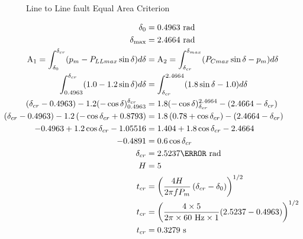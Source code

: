 \documentclass[main.tex]{subfiles}
\begin{document}
\begin{enumerate}
\begin{figure}
\centering{}
\caption{Line to Line fault Equal Area Criterion}
\label{fig:24a_b}
\end{figure}

$$
\begin{aligned}
\delta_0&=0.4963 \text{~rad} \\
\delta_{\mathrm{max}} &= 2.4664 \text{~rad}\\
\mathrm{A}_1=\int_{\delta_0}^{\delta_{cr}} (p_m - P_{LLmax} \sin \delta) d\delta 
&= \mathrm{A}_2 = \int_{\delta_{cr}}^{\delta_{max}} (P_{Cmax} \sin \delta - p_m) d \delta \\
\int_{0.4963}^{\delta_{cr}} (1.0 - 1.2 \sin \delta) d\delta &= \int_{\delta_{cr}}^{2.4664}(1.8 \sin \delta-1.0) d \delta \\
(\delta_{cr} - 0.4963) - 1.2(-\cos \delta)_{0.4963}^{\delta_{cr}} &= 1.8(-\cos \delta)_{\delta_{c r}}^{2.4664}-\left(2.4664-\delta_{c r}\right) \\
\left(\delta_{cr} - 0.4963\right) - 1.2\left(-\cos \delta_{cr} + 0.8793 \right) &= 1.8\left(0.78 + \cos \delta_{cr}\right) - \left(2.4664-\delta_{cr}\right) \\
-0.4963 + 1.2 \cos \delta_{cr} - 1.05516 &= 1.404 + 1.8 \cos \delta_{cr} - 2.4664 \\
-0.4891 &= 0.6 \cos \delta_{c r} \\
\delta_{c r} &= 2.5237 \radian \mathrm{~rad} \\
H &= 5\\
t_{cr} &= \left(\frac{4 H}{2\pi f P_m} \left(\delta_{cr}-\delta_0\right) \right)^{1 / 2} \\
t_{cr} &= \left(\frac{4 \times 5}{2\pi \times 60 \mathrm{~Hz} \times 1} (2.5237-0.4963) \right)^{1 / 2} \\
t_{cr} &= 0.3279 \mathrm{~s} 
\end{aligned}
$$
\end{enumerate}
\end{document}
